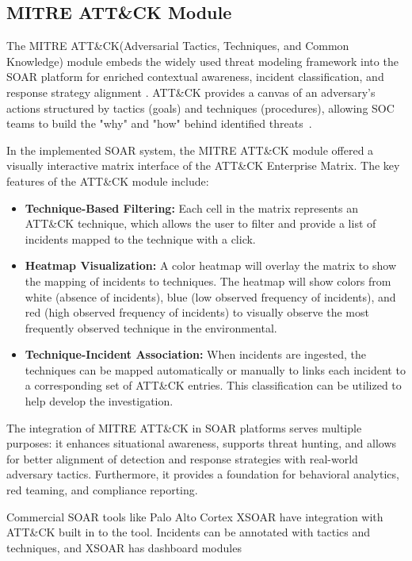 \subsection{MITRE ATT\&CK Module}

The MITRE ATT\&CK(Adversarial Tactics, Techniques, and Common Knowledge) module embeds the widely used threat modeling framework into the SOAR platform for enriched contextual awareness, incident classification, and response strategy alignment . ATT\&CK provides a canvas of an adversary's actions structured by tactics (goals) and techniques (procedures), allowing SOC teams to build the "why" and "how" behind identified threats~\cite{mitre}.

In the implemented SOAR system, the MITRE ATT\&CK module offered a visually interactive matrix interface of the ATT\&CK Enterprise Matrix. The key features of the ATT\&CK module include:

\begin{itemize}
    \item \textbf{Technique-Based Filtering:} Each cell in the matrix represents an ATT\&CK technique, which allows the user to filter and provide a list of incidents mapped to the technique with a click.
    
    \item \textbf{Heatmap Visualization:} A color heatmap will overlay the matrix to show the mapping of incidents to techniques. The heatmap will show colors from white (absence of incidents), blue (low observed frequency of incidents), and red (high observed frequency of incidents) to visually observe the most frequently observed technique in the environmental.
    
    \item \textbf{Technique-Incident Association:} When incidents are ingested, the techniques can be mapped automatically or manually to links each incident to a corresponding set of ATT\&CK entries. This classification can be utilized to help develop the investigation.
\end{itemize}

The integration of MITRE ATT\&CK in SOAR platforms serves multiple purposes: it enhances situational awareness, supports threat hunting, and allows for better alignment of detection and response strategies with real-world adversary tactics. Furthermore, it provides a foundation for behavioral analytics, red teaming, and compliance reporting.

Commercial SOAR tools like Palo Alto Cortex XSOAR have integration with ATT\&CK built in to the tool. Incidents can be annotated with tactics and techniques, and XSOAR has dashboard modules

